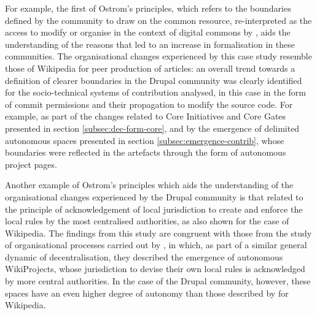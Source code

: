 For example, the first of Ostrom's principles, which refers to the boundaries defined by the community to draw on the common resource, re-interpreted as the access to modify or organise in the context of digital commons by \textcite{forte2009decentralization}, aids the understanding of the reasons that led to an increase in formalisation in these communities. The organisational changes experienced by this case study resemble those of Wikipedia for peer production of articles: an overall trend towards a definition of clearer boundaries in the Drupal community was clearly identified for the socio-technical systems of contribution analysed, in this case in the form of commit permissions and their propagation to modify the source code. For example, as part of the changes related to Core Initiatives and Core Gates presented in section \ref{subsec:dec-form-core}, and by the emergence of delimited autonomous spaces presented in section \ref{subsec:emergence-contrib}, whose boundaries were reflected in the artefacts through the form of autonomous project pages.

Another example of Ostrom's principles which aids the understanding of the organisational changes experienced by the Drupal community is that related to the principle of acknowledgement of local jurisdiction to create and enforce the local rules by the most centralised authorities, as also shown for the case of Wikipedia. The findings from this study are congruent with those from the study of organisational processes carried out by \textcite{forte2009decentralization}, in which, as part of a similar general dynamic of decentralisation, they described the emergence of autonomous WikiProjects, whose jurisdiction to devise their own local rules is acknowledged by more central authorities. In the case of the Drupal community, however, these spaces have an even higher degree of autonomy than those described by \textcite[64]{forte2009decentralization} for Wikipedia.

